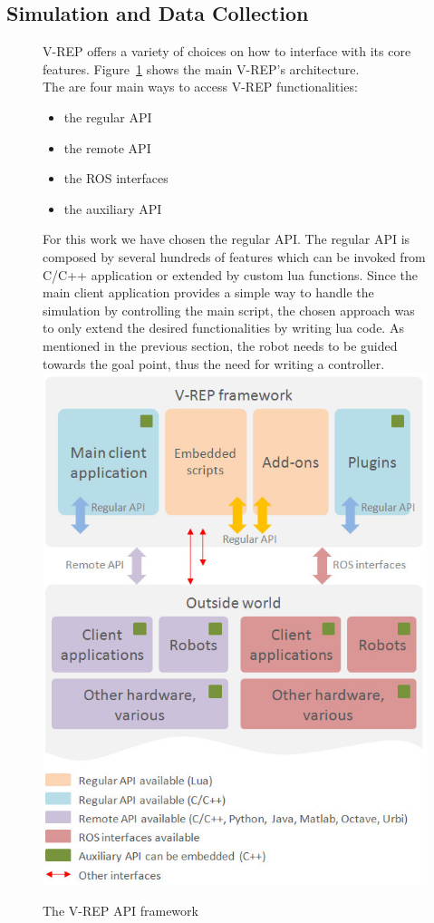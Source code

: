 \documentclass[]{usiinfbachelorproject}
\begin{document}
\subsection{Simulation and Data Collection}
\begin{figure}[h]
    V-REP offers a variety of choices on how to interface with its core features. Figure~\ref{fig:vrep} shows the main V-REP's architecture.\\
    The are four main ways to access V-REP functionalities:
\begin{itemize}
    \item the regular API
    \item the remote API
    \item the ROS \cite{ROS} interfaces
    \item the auxiliary API
\end{itemize}
For this work we have chosen the regular API. The regular API is composed by several hundreds of features which can be invoked from C/C++ application or extended by custom lua functions.
Since the main client application provides a simple way to handle the simulation by controlling the main script, the chosen approach was to only extend the desired functionalities by writing
lua code. As mentioned in the previous section, the robot needs to be guided towards the goal point, thus the need for writing a controller.
\endminipage\hfill
{}
  \includegraphics[width=\linewidth]{vrep}
    \caption{The V-REP API framework}\label{fig:vrep}
\endminipage\hfill
\end{figure}
\end{document}
